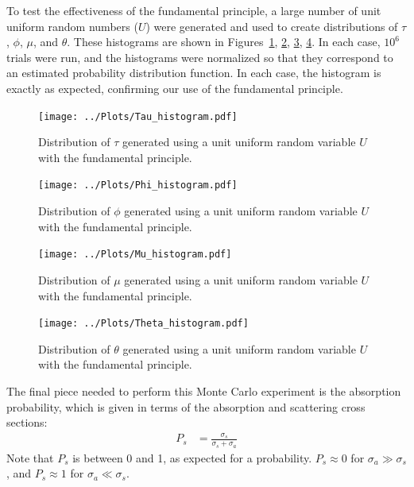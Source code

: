 \documentclass[twocolumn]{myarticle}
\begin{document}
To test the effectiveness of the fundamental principle, a large number of unit uniform random numbers ($ U $) were generated and used to create distributions of $ \tau $, $ \phi $, $ \mu $, and $ \theta $.
These histograms are shown in Figures~\ref{fig:tau_histogram}, \ref{fig:phi_histogram}, \ref{fig:mu_histogram}, \ref{fig:theta_histogram}.
In each case, $ 10^6 $ trials were run, and the histograms were normalized so that they correspond to an estimated probability distribution function.
In each case, the histogram is exactly as expected, confirming our use of the fundamental principle.

\begin{figure}[ht!]
    \begin{center}
    \texttt{[image: ../Plots/Tau\_histogram.pdf]}
    \caption{%
        Distribution of $ \tau $ generated using a unit uniform random variable $ U $ with the fundamental principle.
    }
    \label{fig:tau_histogram}
    \end{center}
\end{figure}

\begin{figure}[ht!]
    \begin{center}
    \texttt{[image: ../Plots/Phi\_histogram.pdf]}
    \caption{%
        Distribution of $ \phi $ generated using a unit uniform random variable $ U $ with the fundamental principle.
    }
    \label{fig:phi_histogram}
    \end{center}
\end{figure}

\begin{figure}[ht!]
    \begin{center}
    \texttt{[image: ../Plots/Mu\_histogram.pdf]}
    \caption{%
        Distribution of $ \mu $ generated using a unit uniform random variable $ U $ with the fundamental principle.
    }
    \label{fig:mu_histogram}
    \end{center}
\end{figure}

\begin{figure}[ht!]
    \begin{center}
    \texttt{[image: ../Plots/Theta\_histogram.pdf]}
    \caption{%
        Distribution of $ \theta $ generated using a unit uniform random variable $ U $ with the fundamental principle.
    }
    \label{fig:theta_histogram}
    \end{center}
\end{figure}

The final piece needed to perform this Monte Carlo experiment is the absorption probability, which is given in terms of the absorption and scattering cross sections:
\begin{align}
    P_s &= \frac{\sigma_s}{\sigma_s + \sigma_a}
\end{align}
Note that $ P_s $ is between 0 and 1, as expected for a probability.
$ P_s \approx 0 $ for $ \sigma_a \gg \sigma_s $, and $ P_s \approx 1 $ for $ \sigma_a \ll \sigma_s $.
\end{document}
